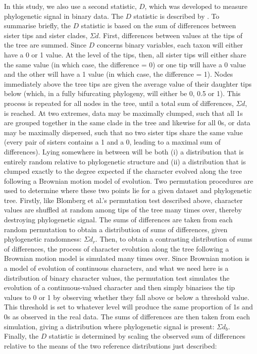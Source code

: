 In this study, we also use a second statistic, \(D\), which was developed to measure phylogenetic signal in binary data. The \(D\) statistic is described by \textcite{fritz_selectivity_2010}. To summarise briefly, the \(D\) statistic is based on the sum of differences between sister tips and sister clades, \(\Sigma d\). First, differences between values at the tips of the tree are summed. Since \(D\) concerns binary variables, each taxon will either have a 0 or 1 value. At the level of the tips, then, all sister tips will either share the same value (in which case, the difference = 0) or one tip will have a 0 value and the other will have a 1 value (in which case, the difference = 1). Nodes immediately above the tree tips are given the average value of their daughter tips below (which, in a fully bifurcating phylogeny, will either be 0, 0.5 or 1). This process is repeated for all nodes in the tree, until a total sum of differences, \(\Sigma d\), is reached. At two extremes, data may be maximally clumped, such that all 1s are grouped together in the same clade in the tree and likewise for all 0s, or data may be maximally dispersed, such that no two sister tips share the same value (every pair of sisters contains a 1 and a 0, leading to a maximal sum of differences). Lying somewhere in between will be both (i) a distribution that is entirely random relative to phylogenetic structure and (ii) a distribution that is clumped exactly to the degree expected if the character evolved along the tree following a Brownian motion model of evolution. Two permutation procedures are used to determine where these two points lie for a given dataset and phylogenetic tree. Firstly, like Blomberg et al.'s permutation test described above, character values are shuffled at random among tips of the tree many times over, thereby destroying phylogenetic signal. The sums of differences are taken from each random permutation to obtain a distribution of sums of differences, given phylogenetic randomness: \(\Sigma d_r\). Then, to obtain a contrasting distribution of sums of differences, the process of character evolution along the tree following a Brownian motion model is simulated many times over. Since Brownian motion is a model of evolution of continuous characters, and what we need here is a distribution of binary character values, the permutation test simulates the evolution of a continuous-valued character and then simply binarises the tip values to 0 or 1 by observing whether they fall above or below a threshold value. This threshold is set to whatever level will produce the same proportion of 1s and 0s as observed in the real data. The sums of differences are then taken from each simulation, giving a distribution where phylogenetic signal is present: \(\Sigma d_b\). Finally, the \(D\) statistic is determined by scaling the observed sum of differences relative to the means of the two reference distributions just described:

